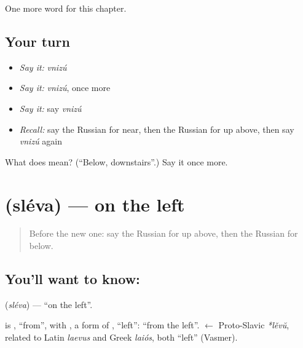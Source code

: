 \begin{grammarlens}[title={What you've built}]
One more word for this chapter.
\end{grammarlens}

\subsection*{Your turn}
\begin{itemize}
\raggedright
  \item \emph{Say it:} \emph{vnizú}
  \item \emph{Say it:} \emph{vnizú}, once more
  \item \emph{Say it:} say \emph{vnizú}
  \item \emph{Recall:} say the Russian for near, then the Russian for up above, then say \emph{vnizú} again
\end{itemize}

\begin{tcolorbox}[breakable,colback=teal!4,colframe=teal!35!black,title={Before you move on}]
What does  mean? (\textquotedblleft{}Below, downstairs\textquotedblright{}.) Say it once more.
\end{tcolorbox}
\section[\texorpdfstring{\ru{слева} (sléva)}{слева (sléva)}]{ (sléva) — on the left}

\label{lesson:RU-C73-left}



\begin{quote}
Before the new one: say the Russian for up above, then the Russian for below.
\end{quote}

\subsection*{You'll want to know: }
\textbf{} (\emph{sléva}) — \textquotedblleft{}on the left\textquotedblright{}.

\begin{cousinweb}
\textbf{} is \emph{}, \textquotedblleft{}from\textquotedblright{}, with \emph{}, a form of \emph{}, \textquotedblleft{}left\textquotedblright{}: \textquotedblleft{}from the left\textquotedblright{}. \emph{} $\leftarrow$ Proto-Slavic \emph{*lěvŭ}, related to Latin \emph{laevus} and Greek \emph{laiós}, both \textquotedblleft{}left\textquotedblright{} (Vasmer).
\end{cousinweb}

